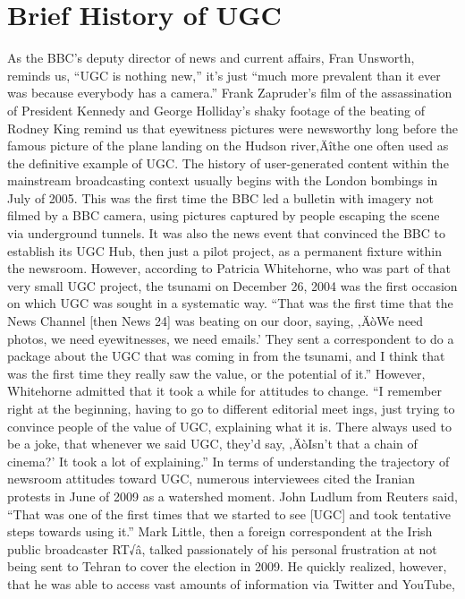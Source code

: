 \documentclass[symmetric, notoc, nobib]{towcenter-book}
\begin{document}
\chapter{Brief History of UGC}
As the BBC's deputy director of news and current affairs, Fran Unsworth,
reminds us, ``UGC is nothing new,'' it's just ``much more prevalent than it
ever was because everybody has a camera.'' Frank Zapruder's film of the
assassination of President Kennedy and George Holliday's shaky footage of
the beating of Rodney King remind us that eyewitness pictures were newsworthy
long before the famous picture of the plane landing on the Hudson
river‚Äîthe one often used as the definitive example of UGC.
The history of user-generated content within the mainstream broadcasting
context usually begins with the London bombings in July of 2005. This was
the first time the BBC led a bulletin with imagery not filmed by a BBC camera,
using pictures captured by people escaping the scene via underground
tunnels. It was also the news event that convinced the BBC to establish
its UGC Hub, then just a pilot project, as a permanent fixture within
the newsroom.
However, according to Patricia Whitehorne, who was part of that very small
UGC project, the tsunami on December 26, 2004 was the first occasion on
which UGC was sought in a systematic way. ``That was the first time that the
News Channel [then News 24] was beating on our door, saying, ‚ÄòWe need
photos, we need eyewitnesses, we need emails.' They sent a correspondent
to do a package about the UGC that was coming in from the tsunami, and I
think that was the first time they really saw the value, or the potential of it.''
However, Whitehorne admitted that it took a while for attitudes to change.
``I remember right at the beginning, having to go to different editorial meet
ings, just trying to convince people of the value of UGC, explaining what it
is. There always used to be a joke, that whenever we said UGC, they'd say,
‚ÄòIsn't that a chain of cinema?' It took a lot of explaining.''
In terms of understanding the trajectory of newsroom attitudes toward
UGC, numerous interviewees cited the Iranian protests in June of 2009 as
a watershed moment. John Ludlum from Reuters said, ``That was one of the
first times that we started to see [UGC] and took tentative steps towards
using it.'' Mark Little, then a foreign correspondent at the Irish public broadcaster
RT√â, talked passionately of his personal frustration at not being sent
to Tehran to cover the election in 2009. He quickly realized, however, that
he was able to access vast amounts of information via Twitter and YouTube,
\end{document}
